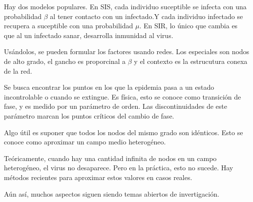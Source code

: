 \documentclass[12pt, letterpaper]{article}
\begin{document}
    Hay dos modelos populares. 
    En SIS, cada individuo suceptible se infecta con
    una probabilidad $\beta$ al tener contacto con un infectado.Y cada individuo
    infectado se recupera a suceptible con una probabilidad $\mu$. En SIR, lo 
    único que cambia es que al un infectado sanar, desarrolla inmunidad al 
    virus.

    Usándolos, se pueden formular los factores
    usando redes. Los especiales son nodos de alto grado, el gancho es
    proporcinal a $\beta$ y el contexto es la estrucutura conexa de la red.
    
    Se busca encontrar los puntos en los que la epidemia pasa a
    un estado incontrolable o cuando se extingue. Es física, esto se conoce como
    transición de fase, y es medido por un parámetro de orden. Las
    discontinuidades de este parámetro marcan los puntos críticos del cambio de
    fase.

    Algo útil es suponer que todos los nodos del mismo grado son idénticos. Esto 
    se conoce como aproximar un campo medio heterogéneo.

    Teóricamente, cuando hay una cantidad infinita de nodos en un campo
    heterogéneo, el virus no desaparece. Pero en la práctica, esto no sucede.
    Hay métodos recientes para aproximar estos valores en casos reales.

    Aún así, muchos aspectos siguen siendo temas abiertos de invertigación.
\end{document}
